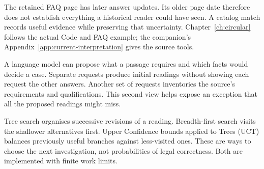 \documentclass[12pt,a4paper,oneside,openany]{book}
\begin{document}
The retained FAQ page has later answer updates. Its older page date therefore
does not establish everything a historical reader could have seen. A catalog
match records useful evidence while preserving that uncertainty.
Chapter~\ref{ch:circular} follows the actual Code and FAQ example;
the companion's Appendix~\ref{app:current-interpretation} gives the source tools.

\clearpage
{}
A language model can propose what a passage requires and which facts would
decide a case. Separate requests produce initial readings without showing each
request the other answers. Another set of requests inventories the source's
requirements and qualifications. This second view helps expose an exception
that all the proposed readings might miss.

\begin{MapDiagram}
\end{MapDiagram}

Tree search organises successive revisions of a reading. Breadth-first search
visits the shallower alternatives first. Upper Confidence bounds applied to
Trees (UCT) balances previously useful branches against less-visited ones.
These are ways to choose the next investigation, not probabilities of legal
correctness. Both are implemented with finite work limits.
\end{document}
